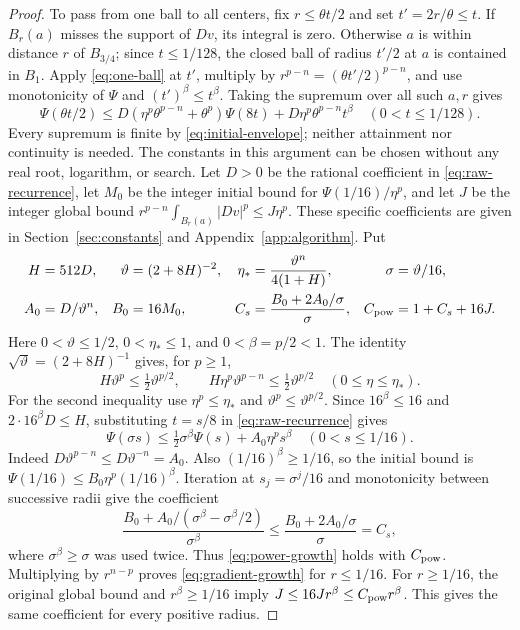 \documentclass[11pt,a4paper]{article}
\numberwithin{equation}{section}
\theoremstyle{definition}
\theoremstyle{remark}
\begin{document}
\begin{proof}
To pass from one ball to all centers, fix $r\leq\theta t/2$ and set
$t'=2r/\theta\leq t$. If $B_r(a)$ misses the support of $Dv$, its
integral is zero. Otherwise $a$ is within distance $r$ of $B_{3/4}$;
since $t\leq1/128$, the closed ball of radius $t'/2$ at $a$ is contained
in $B_1$. Apply \eqref{eq:one-ball} at $t'$, multiply by
$r^{p-n}=(\theta t'/2)^{p-n}$, and use monotonicity of $\Psi$ and
$(t')^\beta\leq t^\beta$. Taking the supremum over all such $a,r$
gives
\begin{equation}\label{eq:raw-recurrence}
 \Psi(\theta t/2)\leq
 D(\eta^p\theta^{p-n}+\theta^p)\Psi(8t)
     +D\eta^p\theta^{p-n}t^\beta
 \quad(0<t\leq1/128).
\end{equation}
Every supremum is finite by \eqref{eq:initial-envelope}; neither
attainment nor continuity is needed. The constants in this argument can be
chosen without any real root, logarithm, or search. Let $D>0$ be the rational
coefficient in \eqref{eq:raw-recurrence}, let $M_0$ be the integer initial
bound for $\Psi(1/16)/\eta^p$, and let $J$ be the integer global bound
$r^{p-n}\int_{B_r(a)}|Dv|^p\leq J\eta^p$. These specific coefficients
are given in Section~\ref{sec:constants} and Appendix~\ref{app:algorithm}.
Put
\begin{align}
 H&=512D,& \vartheta&=(2+8H)^{-2},&
 \eta_*&=\frac{\vartheta^n}{4(1+H)},& \sigma&=\vartheta/16,\label{eq:explicit-scale}\\
 A_0&=D/\vartheta^n,& B_0&=16M_0,&
 C_s&=\frac{B_0+2A_0/\sigma}{\sigma},&
 C_{\rm pow}&=1+C_s+16J.\label{eq:explicit-power}
\end{align}
Here $0<\vartheta\leq1/2$, $0<\eta_*\leq1$, and $0<\beta=p/2<1$.
The identity $\sqrt\vartheta=(2+8H)^{-1}$ gives, for $p\geq1$,
\[
 H\vartheta^p\leq\tfrac12\vartheta^{p/2},\qquad
 H\eta^p\vartheta^{p-n}\leq\tfrac12\vartheta^{p/2}
 \quad(0\leq\eta\leq\eta_*).
\]
For the second inequality use $\eta^p\leq\eta_*$ and
$\vartheta^p\leq\vartheta^{p/2}$. Since $16^\beta\leq16$ and
$2\cdot16^\beta D\leq H$, substituting $t=s/8$ in
\eqref{eq:raw-recurrence} gives
\begin{equation}\label{eq:recurrence}
 \Psi(\sigma s)\leq\tfrac12\sigma^\beta\Psi(s)
                 +A_0\eta^ps^\beta\quad(0<s\leq1/16).
\end{equation}
Indeed $D\vartheta^{p-n}\leq D\vartheta^{-n}=A_0$.
Also $(1/16)^\beta\geq1/16$, so the initial bound is
$\Psi(1/16)\leq B_0\eta^p(1/16)^\beta$.
Iteration at $s_j=\sigma^j/16$ and monotonicity between successive
radii give the coefficient
\[
 \frac{B_0+A_0/(\sigma^\beta-\sigma^\beta/2)}{\sigma^\beta}
 \leq \frac{B_0+2A_0/\sigma}{\sigma}=C_s,
\]
where $\sigma^\beta\geq\sigma$ was used twice.
Thus \eqref{eq:power-growth} holds with $C_{\rm pow}$.
Multiplying by $r^{n-p}$ proves \eqref{eq:gradient-growth} for
$r\leq1/16$. For $r\geq1/16$, the original global bound and
$r^\beta\geq1/16$ imply $J\leq16Jr^\beta\leq C_{\rm pow}r^\beta$.
This gives the same coefficient for every positive radius.
\end{proof}
\end{document}
